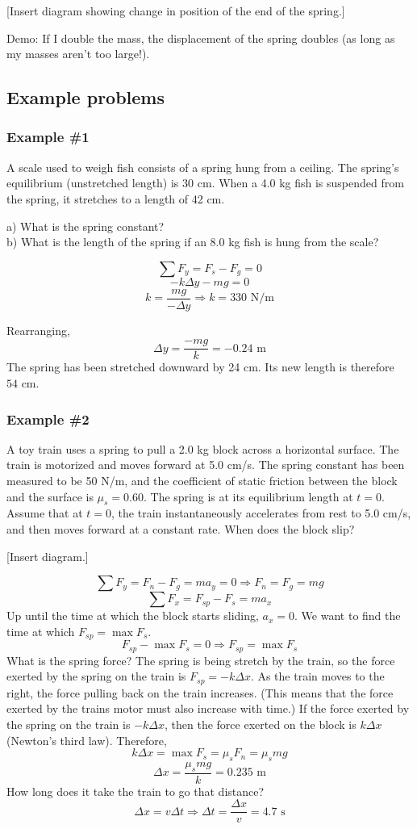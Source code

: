 [Insert diagram showing change in position of the end of the spring.]
\vspace{5cm}

Demo: If I double the mass, the displacement of the spring doubles (as long as my masses aren't too large!).

\subsection{Example problems}
\subsubsection{Example \#1}
A scale used to weigh fish consists of a spring hung from a ceiling. The spring's equilibrium (unstretched length) is 30 cm. When a 4.0 kg fish is suspended from the spring, it stretches to a length of 42 cm.

a) What is the spring constant?\\
b) What is the length of the spring if an 8.0 kg fish is hung from the scale?


$$\sum F_y=F_s-F_g=0$$
$$-k\Delta{y}-mg=0$$
$$k=\frac{mg}{-\Delta{y}}\Rightarrow \boxed{k=330\mbox{ N/m}}$$

Rearranging,
$$\Delta{y}=\frac{-mg}{k}=-0.24\mbox{ m}$$
The spring has been stretched downward by 24 cm. Its new length is therefore $\boxed{54\mbox{ cm}}$.

\subsubsection{Example \#2}
A toy train uses a spring to pull a 2.0 kg block across a horizontal surface. The train is motorized and moves forward at 5.0 cm/s. The spring constant has been measured to be 50 N/m, and the coefficient of static friction between the block and the surface is $\mu_s=0.60$. The spring is at its equilibrium length at $t=0$. Assume that at $t=0$, the train instantaneously accelerates from rest to 5.0 cm/s, and then moves forward at a constant rate. When does the block slip?

[Insert diagram.]
\vspace{5cm}

$$\sum F_y = F_n-F_g=ma_y=0 \Rightarrow F_n=F_g=mg$$
$$\sum F_x = F_{sp}-F_s=ma_x$$
Up until the time at which the block starts sliding, $a_x=0$. We want to find the time at which $F_{sp}=\max F_s$.
$$F_{sp}-\max F_s=0\Rightarrow F_{sp}=\max F_s$$
What is the spring force? The spring is being stretch by the train, so the force exerted by the spring on the train is $F_{sp}=-k\Delta{x}$. As the train moves to the right, the force pulling back on the train increases. (This means that the force exerted by the trains motor must also increase with time.) If the force exerted by the spring on the train is $-k\Delta{x}$, then the force exerted on the block is $k\Delta{x}$ (Newton's third law). Therefore,
$$k\Delta{x}=\max F_s=\mu_s F_n=\mu_s mg$$
$$\Delta{x}=\frac{\mu_s mg}{k}=0.235\mbox{ m}$$
How long does it take the train to go that distance?
$$\Delta{x}=v\Delta{t}\Rightarrow \Delta{t}=\frac{\Delta{x}}{v}=4.7\mbox{ s}$$


\clearpage

